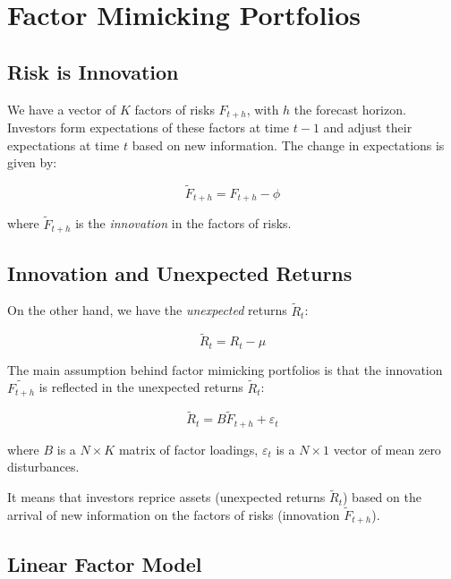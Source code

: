 \chapter{Factor Mimicking Portfolios}


\section{Risk is Innovation}

We have a vector of $K$ factors of risks $F_{t+h}$, with $h$ the 
forecast horizon. 
Investors form expectations of these factors at time $t-1$ and
adjust their expectations at time $t$ based on new information.
The change in expectations is given by:

\begin{equation}
    \tilde{F}_{t+h} = F_{t+h} - \phi
\end{equation}

where $\tilde{F}_{t+h}$ is the \textit{innovation} in the factors of risks.


\section{Innovation and Unexpected Returns}

On the other hand, we have the \textit{unexpected} returns $\tilde{R}_t$:

\begin{equation}
    \tilde{R}_t = R_t - \mu
\end{equation}

The main assumption behind factor mimicking portfolios is that the innovation 
$\tilde{F_{t+h}}$ is reflected in the unexpected returns $\tilde{R}_t$:

\begin{equation}
    \tilde{R}_t = B \tilde{F}_{t+h} + \varepsilon_t
\end{equation}
    
where $B$ is a $N \times K$ matrix of factor loadings, $\varepsilon_t$ is a $N \times 1$ vector of mean zero disturbances.

It means that investors reprice assets (unexpected returns $\tilde{R}_t$) based on the arrival of new information on the factors of risks (innovation $\tilde{F}_{t+h}$).


\section{Linear Factor Model}

